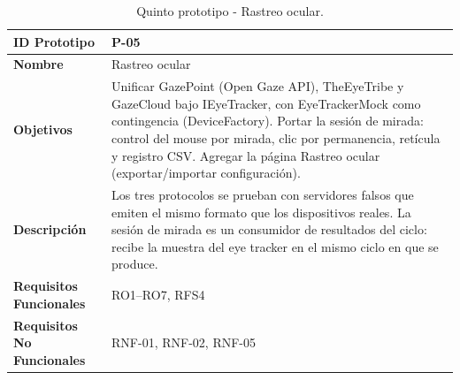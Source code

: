 \begin{table}[H]
\centering
\caption{Quinto prototipo - Rastreo ocular.}
\label{tab:prototipo-p05}
\small
\begin{tabularx}{\textwidth}{>{\bfseries}l X}
\toprule
ID Prototipo & P-05 \\ \midrule
Nombre & Rastreo ocular \\ \midrule
Objetivos & Unificar GazePoint (Open Gaze API), TheEyeTribe y GazeCloud bajo IEyeTracker, con EyeTrackerMock como contingencia (DeviceFactory). \newline Portar la sesión de mirada: control del mouse por mirada, clic por permanencia, retícula y registro CSV. \newline Agregar la página Rastreo ocular (exportar/importar configuración). \\ \midrule
Descripción & Los tres protocolos se prueban con servidores falsos que emiten el mismo formato que los dispositivos reales. La sesión de mirada es un consumidor de resultados del ciclo: recibe la muestra del eye tracker en el mismo ciclo en que se produce. \\ \midrule
Requisitos Funcionales & RO1–RO7, RFS4 \\ \midrule
Requisitos No Funcionales & RNF-01, RNF-02, RNF-05 \\ \bottomrule
\end{tabularx}
\end{table}
